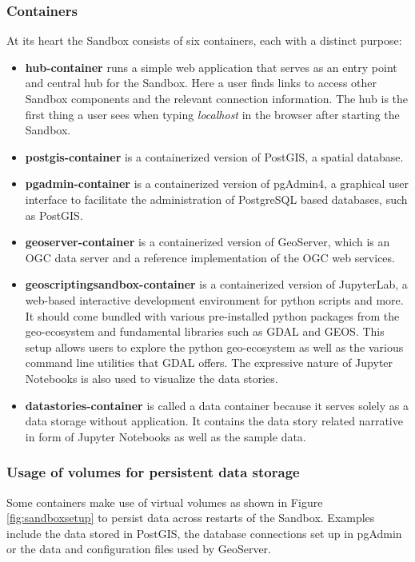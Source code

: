 \documentclass[11pt, a4paper, oneside, parskip=full-]{scrartcl}
\begin{document}
\subsubsection*{Containers}
At its heart the Sandbox consists of six containers, each with a distinct
purpose:

\begin{itemize}
  \item \textbf{hub-container} runs a simple web application that serves as an
  entry point and central hub for the Sandbox. Here a user finds links to access
  other Sandbox components and the relevant connection information. The hub is
  the first thing a user sees when typing \emph{localhost} in the browser after
  starting the Sandbox.
  \item \textbf{postgis-container} is a containerized version of PostGIS, a
  spatial database.
  \item \textbf{pgadmin-container} is a containerized version of pgAdmin4, a
  graphical user interface to facilitate the administration of PostgreSQL based
  databases, such as PostGIS.
  \item \textbf{geoserver-container} is a containerized version of GeoServer,
  which is an OGC data server and a reference implementation of the OGC web
  services.
  \item \textbf{geoscriptingsandbox-container} is a containerized version of
  JupyterLab, a web-based interactive development environment for python scripts
  and more. It should come bundled with various pre-installed python packages
  from the geo-ecosystem and fundamental libraries such as GDAL and
  GEOS\cite{geos}. This setup allows users to explore the python geo-ecosystem
  as well as the various command line utilities that GDAL offers. The expressive
  nature of Jupyter Notebooks is also used to visualize the data stories.
  \item \textbf{datastories-container} is called a data container because it
  serves solely as a data storage without application. It contains the data
  story related narrative in form of Jupyter Notebooks as well as the sample
  data.
\end{itemize}

\subsubsection*{Usage of volumes for persistent data storage}
Some containers make use of virtual volumes as shown in Figure
\ref{fig:sandboxsetup} to persist data across restarts of the Sandbox. Examples
include the data stored in PostGIS, the database connections set up in pgAdmin
or the data and configuration files used by GeoServer.
\end{document}
